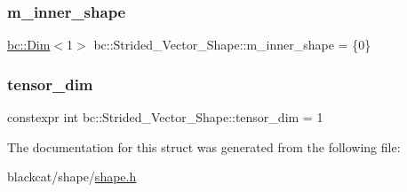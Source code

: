 \subsubsection{\texorpdfstring{m\+\_\+inner\+\_\+shape}{m\_inner\_shape}}
{\footnotesize\ttfamily \hyperlink{structbc_1_1Dim}{bc\+::\+Dim}$<$1$>$ bc\+::\+Strided\+\_\+\+Vector\+\_\+\+Shape\+::m\+\_\+inner\+\_\+shape = \{0\}}

\mbox{\label{structbc_1_1Strided__Vector__Shape_a28edcbb59d225b1e8fa7176d2412cddf}} 
\subsubsection{\texorpdfstring{tensor\+\_\+dim}{tensor\_dim}}
{\footnotesize\ttfamily constexpr int bc\+::\+Strided\+\_\+\+Vector\+\_\+\+Shape\+::tensor\+\_\+dim = 1\hspace{0.3cm}{\ttfamily [static]}}



The documentation for this struct was generated from the following file\+:\begin{DoxyCompactItemize}
\item 
blackcat/shape/\hyperlink{shape_2shape_8h}{shape.\+h}\end{DoxyCompactItemize}
